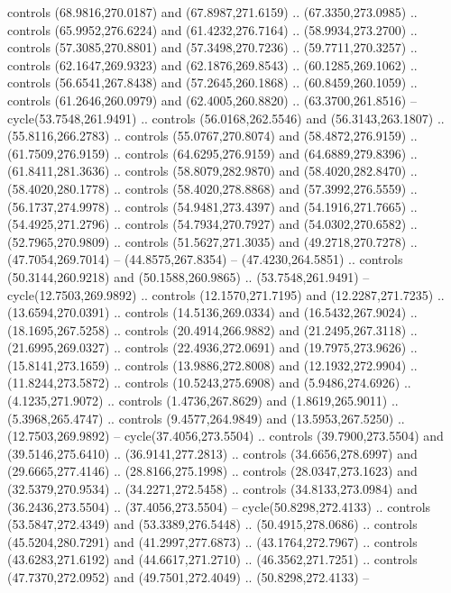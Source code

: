 \begin{scope}[cm={{1.25,0.0,0.0,-1.25,(0.0,743.43331)}}]
    controls (68.9816,270.0187) and (67.8987,271.6159) .. (67.3350,273.0985) ..
    controls (65.9952,276.6224) and (61.4232,276.7164) .. (58.9934,273.2700) ..
    controls (57.3085,270.8801) and (57.3498,270.7236) .. (59.7711,270.3257) ..
    controls (62.1647,269.9323) and (62.1876,269.8543) .. (60.1285,269.1062) ..
    controls (56.6541,267.8438) and (57.2645,260.1868) .. (60.8459,260.1059) ..
    controls (61.2646,260.0979) and (62.4005,260.8820) .. (63.3700,261.8516) --
    cycle(53.7548,261.9491) .. controls (56.0168,262.5546) and (56.3143,263.1807)
    .. (55.8116,266.2783) .. controls (55.0767,270.8074) and (58.4872,276.9159) ..
    (61.7509,276.9159) .. controls (64.6295,276.9159) and (64.6889,279.8396) ..
    (61.8411,281.3636) .. controls (58.8079,282.9870) and (58.4020,282.8470) ..
    (58.4020,280.1778) .. controls (58.4020,278.8868) and (57.3992,276.5559) ..
    (56.1737,274.9978) .. controls (54.9481,273.4397) and (54.1916,271.7665) ..
    (54.4925,271.2796) .. controls (54.7934,270.7927) and (54.0302,270.6582) ..
    (52.7965,270.9809) .. controls (51.5627,271.3035) and (49.2718,270.7278) ..
    (47.7054,269.7014) -- (44.8575,267.8354) -- (47.4230,264.5851) .. controls
    (50.3144,260.9218) and (50.1588,260.9865) .. (53.7548,261.9491) --
    cycle(12.7503,269.9892) .. controls (12.1570,271.7195) and (12.2287,271.7235)
    .. (13.6594,270.0391) .. controls (14.5136,269.0334) and (16.5432,267.9024) ..
    (18.1695,267.5258) .. controls (20.4914,266.9882) and (21.2495,267.3118) ..
    (21.6995,269.0327) .. controls (22.4936,272.0691) and (19.7975,273.9626) ..
    (15.8141,273.1659) .. controls (13.9886,272.8008) and (12.1932,272.9904) ..
    (11.8244,273.5872) .. controls (10.5243,275.6908) and (5.9486,274.6926) ..
    (4.1235,271.9072) .. controls (1.4736,267.8629) and (1.8619,265.9011) ..
    (5.3968,265.4747) .. controls (9.4577,264.9849) and (13.5953,267.5250) ..
    (12.7503,269.9892) -- cycle(37.4056,273.5504) .. controls (39.7900,273.5504)
    and (39.5146,275.6410) .. (36.9141,277.2813) .. controls (34.6656,278.6997)
    and (29.6665,277.4146) .. (28.8166,275.1998) .. controls (28.0347,273.1623)
    and (32.5379,270.9534) .. (34.2271,272.5458) .. controls (34.8133,273.0984)
    and (36.2436,273.5504) .. (37.4056,273.5504) -- cycle(50.8298,272.4133) ..
    controls (53.5847,272.4349) and (53.3389,276.5448) .. (50.4915,278.0686) ..
    controls (45.5204,280.7291) and (41.2997,277.6873) .. (43.1764,272.7967) ..
    controls (43.6283,271.6192) and (44.6617,271.2710) .. (46.3562,271.7251) ..
    controls (47.7370,272.0952) and (49.7501,272.4049) .. (50.8298,272.4133) --

\end{scope}
